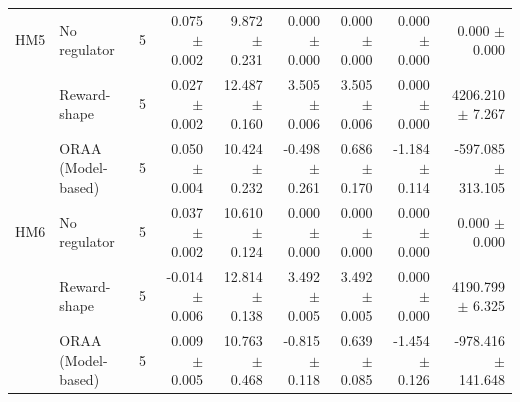 \begin{tabular}{llrrrrrrr}
\addlinespace
HM5 & No regulator & 5 & 0.075 $\pm$ 0.002 & 9.872 $\pm$ 0.231 & 0.000 $\pm$ 0.000 & 0.000 $\pm$ 0.000 & 0.000 $\pm$ 0.000 & 0.000 $\pm$ 0.000 \\
 & Reward-shape & 5 & 0.027 $\pm$ 0.002 & 12.487 $\pm$ 0.160 & 3.505 $\pm$ 0.006 & 3.505 $\pm$ 0.006 & 0.000 $\pm$ 0.000 & 4206.210 $\pm$ 7.267 \\
 & ORAA (Model-based) & 5 & 0.050 $\pm$ 0.004 & 10.424 $\pm$ 0.232 & -0.498 $\pm$ 0.261 & 0.686 $\pm$ 0.170 & -1.184 $\pm$ 0.114 & -597.085 $\pm$ 313.105 \\
\addlinespace
HM6 & No regulator & 5 & 0.037 $\pm$ 0.002 & 10.610 $\pm$ 0.124 & 0.000 $\pm$ 0.000 & 0.000 $\pm$ 0.000 & 0.000 $\pm$ 0.000 & 0.000 $\pm$ 0.000 \\
 & Reward-shape & 5 & -0.014 $\pm$ 0.006 & 12.814 $\pm$ 0.138 & 3.492 $\pm$ 0.005 & 3.492 $\pm$ 0.005 & 0.000 $\pm$ 0.000 & 4190.799 $\pm$ 6.325 \\
 & ORAA (Model-based) & 5 & 0.009 $\pm$ 0.005 & 10.763 $\pm$ 0.468 & -0.815 $\pm$ 0.118 & 0.639 $\pm$ 0.085 & -1.454 $\pm$ 0.126 & -978.416 $\pm$ 141.648 \\
\bottomrule
\end{tabular}
